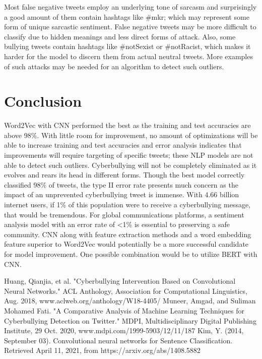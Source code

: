 \documentclass[conference]{IEEEtran}
\begin{document}
Most false negative tweets employ an underlying tone of sarcasm and surprisingly a good amount of them contain hashtags like \#mkr; which may represent some form of unique sarcastic sentiment. False negative tweets may be more difficult to classify due to hidden meanings and less direct forms of attack. Also, some bullying tweets contain hashtags like \#notSexist or \#notRacist, which makes it harder for the model to discern them from actual neutral tweets. More examples of such attacks may be needed for an algorithm to detect such outliers.

\section{Conclusion}

Word2Vec with CNN performed the best as the training and test accuracies are above 98\%. With little room for improvement, no amount of optimizations will be able to increase training and test accuracies and error analysis indicates that improvements will require targeting of specific tweets; these NLP models are not able to detect such outliers.
	Cyberbullying will not be completely eliminated as it evolves and rears its head in different forms. Though the best model correctly classified 98\% of tweets, the type II error rate presents much concern as the impact of an unprevented cyberbullying tweet is immense. With 4.66 billion internet users, if 1\% of this population were to receive a cyberbullying message, that would be tremendous. For global communications platforms, a sentiment analysis model with an error rate of  <1\% is essential to preserving a safe community. CNN along with feature extraction methods and a word embedding feature superior to Word2Vec would potentially be a more successful candidate for model improvement. One possible combination would be to utilize BERT with CNN.


\begin{thebibliography}{00}
 Huang, Qianjia, et al. "Cyberbullying Intervention Based on Convolutional Neural Networks." ACL Anthology, Association for Computational Linguistics, Aug. 2018, www.aclweb.org/anthology/W18-4405/
 Muneer, Amgad, and Suliman Mohamed Fati. "A Comparative Analysis of Machine Learning Techniques for Cyberbullying Detection on Twitter." MDPI, Multidisciplinary Digital Publishing Institute, 29 Oct. 2020, www.mdpi.com/1999-5903/12/11/187
 Kim, Y. (2014, September 03). Convolutional neural networks for Sentence Classification. Retrieved April 11, 2021, from https://arxiv.org/abs/1408.5882
\end{thebibliography}
\vspace{12pt}
\end{document}
